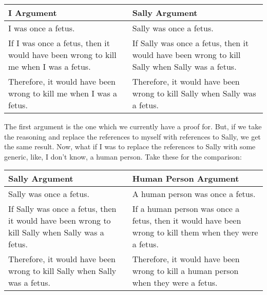 \noindent
\begin{tabular}{p{2.75in}|p{2.75in}}
    I Argument&Sally Argument\\\hline
    I was once a fetus.&Sally was once a fetus.\\\hline
    If I was once a fetus, then it would have been wrong to kill me when I was a fetus.&If Sally was once a fetus, then it would have been wrong to kill Sally when Sally was a fetus.\\\hline 
    Therefore, it would have been wrong to kill me when I was a fetus.&    Therefore, it would have been wrong to kill Sally when Sally was a fetus.
 \end{tabular}

The first argument is the one which we currently have a proof for. But, if we take the reasoning and replace the references to myself with references to Sally, we get the same result. Now, what if I was to replace the references to Sally with some generic, like, I don't know, a human person. Take these for the comparison:


\noindent
\begin{tabular}{p{2.75in}|p{2.75in}}
    Sally Argument&Human Person Argument\\\hline
    Sally was once a fetus.&A human person was once a fetus.\\\hline
    If Sally was once a fetus, then it would have been wrong to kill Sally when Sally was a fetus.& If a human person was once a fetus, then it would have been wrong to kill them when they were a fetus.\\\hline 
    Therefore, it would have been wrong to kill Sally when Sally was a fetus.& Therefore, it would have been wrong to kill a human person when they were a fetus. 
\end{tabular}

